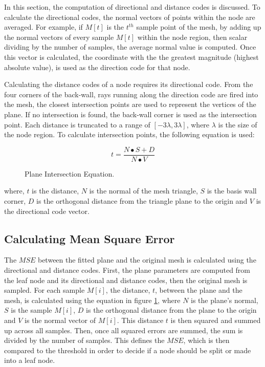 In this section, the computation of directional and distance codes is discussed. To calculate the directional codes, the normal vectors of points within the node are averaged. For example, if $M[t]$ is the $t^{th}$ sample point of the mesh, by adding up the normal vectors of every sample $M[t]$ within the node region, then scalar dividing by the number of samples, the average normal value is computed. Once this vector is calculated, the coordinate with the the greatest magnitude (highest absolute value), is used as the direction code for that node.

Calculating the distance codes of a node requires its directional code. From the four corners of the back-wall, rays running along the direction code are fired into the mesh, the closest intersection points are used to represent the vertices of the plane. If no intersection is found, the back-wall corner is used as the intersection point. Each distance is truncated to a range of $[-3\lambda, 3\lambda]$, where $\lambda$ is the size of the node region. To calculate intersection points, the following equation is used:

\begin{figure}[!h]
\label{RayPlaneIntersection}
$$
t = \frac{N \bullet S + D}{N \bullet V}
$$
\caption{Plane Intersection Equation.}
\end{figure}

where, $t$ is the distance, $N$ is the normal of the mesh triangle, $S$ is the basis wall corner, $D$ is the orthogonal distance from the triangle plane to the origin and $V$ is the directional code vector.

\subsection{Calculating Mean Square Error}

The $MSE$ between the fitted plane and the original mesh is calculated using the directional and distance codes. First, the plane parameters are computed from the leaf node and its directional and distance codes, then the original mesh is sampled. For each sample $M[i]$, the distance, $t$, between the plane and the mesh,  is calculated using the equation in figure \ref{RayPlaneIntersection}, where $N$ is the plane's normal, $S$ is the sample $M[i]$, $D$ is the orthogonal distance from the plane to the origin and $V$ is the normal vector of $M[i]$. This distance $t$ is then squared and summed up across all samples. Then, once all squared errors are summed, the sum is divided by the number of samples. This defines the $MSE$, which is then compared to the threshold in order to decide if a node should be split or made into a leaf node.

